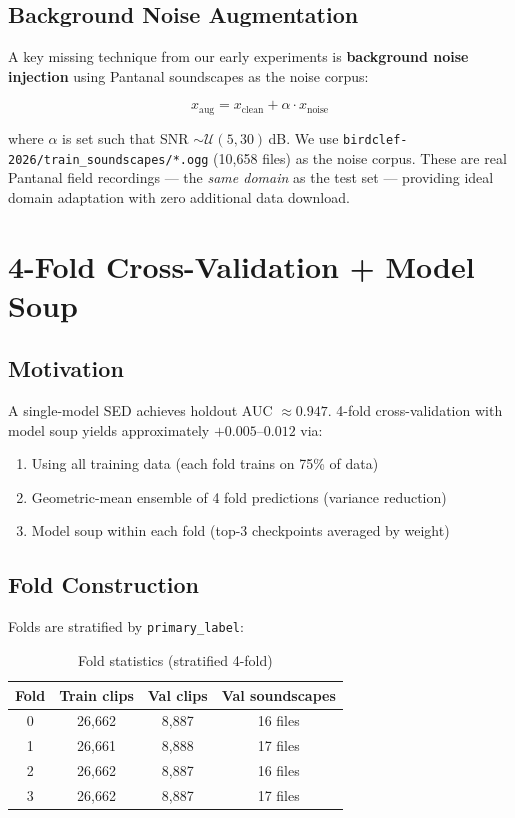 \documentclass[11pt,a4paper]{article}
\begin{document}
\subsection{Background Noise Augmentation}

A key missing technique from our early experiments is \textbf{background noise injection}
using Pantanal soundscapes as the noise corpus:

\begin{equation}
x_{\text{aug}} = x_{\text{clean}} + \alpha \cdot x_{\text{noise}}
\end{equation}

where $\alpha$ is set such that SNR $\sim \mathcal{U}(5, 30)$\,dB. We use
\texttt{birdclef-2026/train\_soundscapes/*.ogg} (10{,}658 files) as the noise corpus.
These are real Pantanal field recordings — the \emph{same domain} as the test set —
providing ideal domain adaptation with zero additional data download.

\section{4-Fold Cross-Validation + Model Soup}
\label{sec:cv}

\subsection{Motivation}

A single-model SED achieves holdout AUC $\approx 0.947$. 4-fold cross-validation
with model soup yields approximately $+0.005$--$0.012$ via:
\begin{enumerate}[leftmargin=1.5em]
\item Using all training data (each fold trains on 75\% of data)
\item Geometric-mean ensemble of 4 fold predictions (variance reduction)
\item Model soup within each fold (top-3 checkpoints averaged by weight)
\end{enumerate}

\subsection{Fold Construction}

Folds are stratified by \texttt{primary\_label}:

\begin{table}[H]
\centering
\caption{Fold statistics (stratified 4-fold)}
\begin{tabular}{cccc}
\toprule
\textbf{Fold} & \textbf{Train clips} & \textbf{Val clips} & \textbf{Val soundscapes} \\
\midrule
0 & 26{,}662 & 8{,}887 & 16 files \\
1 & 26{,}661 & 8{,}888 & 17 files \\
2 & 26{,}662 & 8{,}887 & 16 files \\
3 & 26{,}662 & 8{,}887 & 17 files \\
\bottomrule
\end{tabular}
\end{table}
\end{document}
